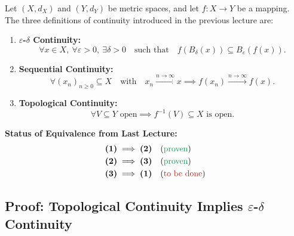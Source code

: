 \begin{content}
Let $(X, d_X)$ and $(Y, d_Y)$ be metric spaces, and let $f \colon X \to Y$ be a mapping. The three definitions of continuity introduced in the previous lecture are:

\begin{enumerate}[label=\textbf{(\arabic*)}]
    \setcounter{enumi}{0}
    \item \textbf{$\varepsilon$-$\delta$ Continuity:}
    \[
    \forall x \in X, \ \forall \varepsilon > 0, \ \exists \delta > 0 \quad \text{such that} \quad f(B_\delta(x)) \subseteq B_\varepsilon(f(x)).
    \]
    \setcounter{enumi}{1}
    \item \textbf{Sequential Continuity:}
    \[
    \forall (x_n)_{n \ge 0} \subseteq X \quad \text{with} \quad x_n \xrightarrow{n \to \infty} x \implies f(x_n) \xrightarrow{n \to \infty} f(x).
    \]
    \setcounter{enumi}{2}
    \item \textbf{Topological Continuity:}
    \[
    \forall V \subseteq Y \text{ open} \implies f^{-1}(V) \subseteq X \text{ is open}.
    \]
\end{enumerate}

\par\vspace{1ex}\noindent
\textbf{Status of Equivalence from Last Lecture:}
\begin{align*}
    \textbf{(1)} &\implies \textbf{(2)} && \text{(\textcolor{ForestGreen}{proven})} \\
    \textbf{(2)} &\implies \textbf{(3)} && \text{(\textcolor{ForestGreen}{proven})} \\
    \textbf{(3)} &\implies \textbf{(1)} && \text{(\textcolor{BrickRed}{to be done})}
\end{align*}
\end{content}

\subsection{Proof: Topological Continuity Implies \texorpdfstring{$\varepsilon$-$\delta$}{epsilon-delta} Continuity}


